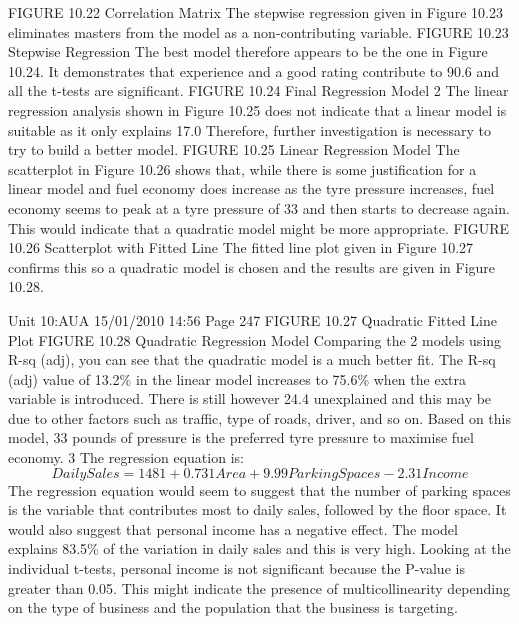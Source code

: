 \documentclass[]{report}
\begin{document}
FIGURE 10.22 Correlation Matrix
The stepwise regression given in Figure 10.23 eliminates masters from the model
as a non-contributing variable.
FIGURE 10.23 Stepwise Regression
The best model therefore appears to be the one in Figure 10.24. It demonstrates
that experience and a good rating contribute to 90.6%
and all the t-tests are significant.
FIGURE 10.24 Final Regression Model
2 The linear regression analysis shown in Figure 10.25 does not indicate that a
linear model is suitable as it only explains 17.0%
Therefore, further investigation is necessary to try to build a better model.
FIGURE 10.25 Linear Regression Model
The scatterplot in Figure 10.26 shows that, while there is some justification for
a linear model and fuel economy does increase as the tyre pressure increases, fuel
economy seems to peak at a tyre pressure of 33 and then starts to decrease
again. This would indicate that a quadratic model might be more appropriate.
FIGURE 10.26 Scatterplot with Fitted Line
The fitted line plot given in Figure 10.27 confirms this so a quadratic model is
chosen and the results are given in Figure 10.28.


Unit 10:AUA 15/01/2010 14:56 Page 247
FIGURE 10.27 Quadratic Fitted Line Plot
FIGURE 10.28 Quadratic Regression Model
Comparing the 2 models using R-sq (adj), you can see that the quadratic model
is a much better fit. The R-sq (adj) value of 13.2\% in the linear model increases
to 75.6\% when the extra variable is introduced. There is still however 24.4%
unexplained and this may be due to other factors such as traffic, type of roads,
driver, and so on. Based on this model, 33 pounds of pressure is the preferred tyre
pressure to maximise fuel economy.
3 The regression equation is:
\[Daily Sales = 1481 + 0.731 Area + 9.99 Parking Spaces - 2.31 Income\]
The regression equation would seem to suggest that the number of parking
spaces is the variable that contributes most to daily sales, followed by the floor
space. It would also suggest that personal income has a negative effect. The
model explains 83.5\% of the variation in daily sales and this is very high. Looking
at the individual t-tests, personal income is not significant because the P-value
is greater than 0.05. This might indicate the presence of multicollinearity
depending on the type of business and the population that the business is
targeting.
\end{document}
